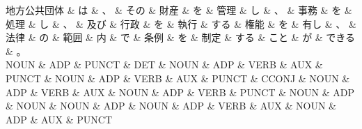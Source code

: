 \documentclass[tikz,border=5pt]{standalone}
\begin{document}
\small
\begin{dependency}[edge unit distance=11.9pt]
    \begin{deptext}[column sep=0.5em]
        地方公共団体 \& は \& 、 \& その \& 財産 \& を \& 管理 \& し \& 、 \& 事務 \& を \& 処理 \& し \& 、 \& 及び \& 行政 \& を \& 執行 \& する \& 権能 \& を \& 有し \& 、 \& 法律 \& の \& 範囲 \& 内 \& で \& 条例 \& を \& 制定 \& する \& こと \& が \& できる \& 。\\
        NOUN \& ADP \& PUNCT \& DET \& NOUN \& ADP \& VERB \& AUX \& PUNCT \& NOUN \& ADP \& VERB \& AUX \& PUNCT \& CCONJ \& NOUN \& ADP \& VERB \& AUX \& NOUN \& ADP \& VERB \& PUNCT \& NOUN \& ADP \& NOUN \& NOUN \& ADP \& NOUN \& ADP \& VERB \& AUX \& NOUN \& ADP \& AUX \& PUNCT\\
    \end{deptext}
\end{dependency}
\end{document}
